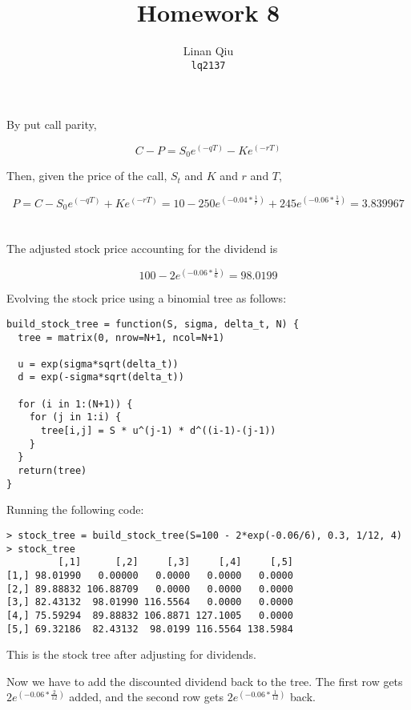 \documentclass[11pt]{scrartcl}
\title{Homework 8}
\author{Linan Qiu\\\texttt{lq2137}}
\newcommand{\epower}[1]{\ensuremath{e^{\left(#1\right)}}}
\begin{document}
\maketitle

\section{}

By put call parity,

\[C - P = S_0\epower{-qT} - K\epower{-rT}\]

Then, given the price of the call, $S_t$ and $K$ and $r$ and $T$,

\[P = C - S_0\epower{-qT} + K\epower{-rT} = 10 - 250\epower{-0.04*\frac{1}{r}} + 245\epower{-0.06*\frac{1}{4}} = 3.839967\]

\section{}

The adjusted stock price accounting for the dividend is

\[100 - 2\epower{-0.06*\frac{1}{6}} = 98.0199\]

Evolving the stock price using a binomial tree as follows:

\begin{lstlisting}
build_stock_tree = function(S, sigma, delta_t, N) {
  tree = matrix(0, nrow=N+1, ncol=N+1)
  
  u = exp(sigma*sqrt(delta_t))
  d = exp(-sigma*sqrt(delta_t))
  
  for (i in 1:(N+1)) {
    for (j in 1:i) {
      tree[i,j] = S * u^(j-1) * d^((i-1)-(j-1))
    }
  }
  return(tree)
}
\end{lstlisting}

Running the following code:

\begin{lstlisting}
> stock_tree = build_stock_tree(S=100 - 2*exp(-0.06/6), 0.3, 1/12, 4)
> stock_tree
         [,1]      [,2]     [,3]     [,4]     [,5]
[1,] 98.01990   0.00000   0.0000   0.0000   0.0000
[2,] 89.88832 106.88709   0.0000   0.0000   0.0000
[3,] 82.43132  98.01990 116.5564   0.0000   0.0000
[4,] 75.59294  89.88832 106.8871 127.1005   0.0000
[5,] 69.32186  82.43132  98.0199 116.5564 138.5984
\end{lstlisting}

This is the stock tree after adjusting for dividends.

Now we have to add the discounted dividend back to the tree. The first row gets $2\epower{-0.06*\frac{2}{12}}$ added, and the second row gets $2\epower{-0.06*\frac{1}{12}}$ back.
\end{document}
